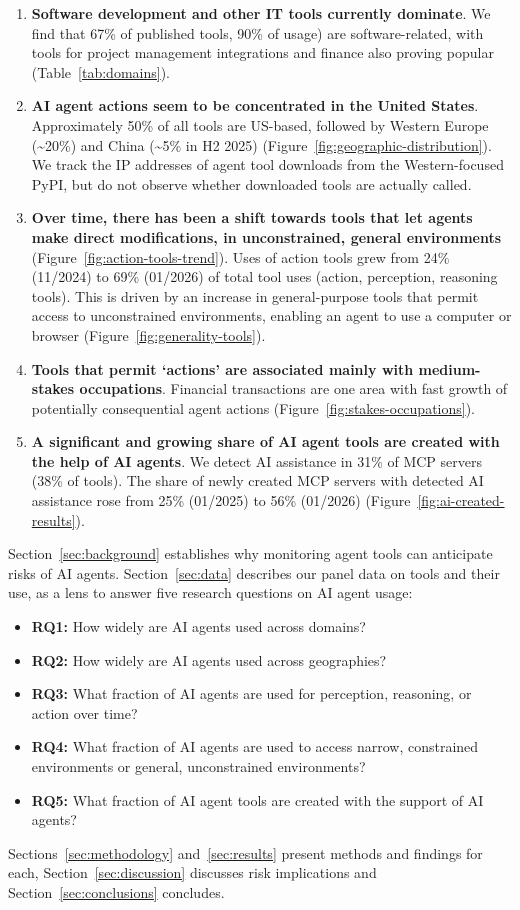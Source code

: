 \documentclass[manuscript,screen,nonacm,oneside]{acmart}
\begin{document}
\begin{enumerate}
\def\labelenumi{\arabic{enumi}.}
\item
 \textbf{Software development and other IT tools currently dominate}. We find that 67\% of published tools, 90\% of usage) are software-related, with tools for project management integrations and finance also proving popular (Table~\ref{tab:domains}).
\item
 \textbf{AI agent actions seem to be concentrated in the United States}. Approximately 50\% of all tools are US-based, followed by Western Europe (\textasciitilde20\%) and China (\textasciitilde5\% in H2 2025) (Figure~\ref{fig:geographic-distribution}). We track the IP addresses of agent tool downloads from the Western-focused PyPI, but do not observe whether downloaded tools are actually called.
\item
 \textbf{Over time, there has been a shift towards tools that let agents make direct modifications, in unconstrained, general environments} (Figure~\ref{fig:action-tools-trend}). Uses of action tools grew from 24\% (11/2024) to 69\% (01/2026) of total tool uses (action, perception, reasoning tools). This is driven by an increase in general-purpose tools that permit access to unconstrained environments, enabling an agent to use a computer or browser (Figure~\ref{fig:generality-tools}).
\item
 \textbf{Tools that permit `actions' are associated mainly with medium-stakes occupations}. Financial transactions are one area with fast growth of potentially consequential agent actions (Figure~\ref{fig:stakes-occupations}).
\item
 \textbf{A significant and growing share of AI agent tools are created with the help of AI agents}. We detect AI assistance in 31\% of MCP servers (38\% of tools). The share of newly created MCP servers with detected AI assistance rose from 25\% (01/2025) to 56\% (01/2026) (Figure~\ref{fig:ai-created-results}).
\end{enumerate}

Section~\ref{sec:background} establishes why monitoring agent tools can anticipate risks of AI agents. Section~\ref{sec:data} describes our panel data on tools and their use, as a lens to answer five research questions on AI agent usage:
\begin{itemize}
    \item \textbf{RQ1:} How widely are AI agents used across domains?
    \item \textbf{RQ2:} How widely are AI agents used across geographies?
    \item \textbf{RQ3:} What fraction of AI agents are used for perception, reasoning, or action over time?
    \item \textbf{RQ4:} What fraction of AI agents are used to access narrow, constrained environments or general, unconstrained environments?
    \item \textbf{RQ5:} What fraction of AI agent tools are created with the support of AI agents?
\end{itemize}
Sections~\ref{sec:methodology} and~\ref{sec:results} present methods and findings for each, Section~\ref{sec:discussion} discusses risk implications and Section~\ref{sec:conclusions} concludes.
\end{document}
